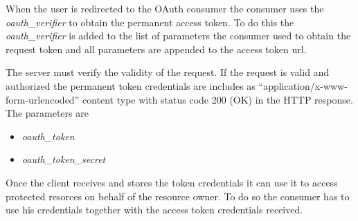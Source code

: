 When the user is redirected to the OAuth consumer the consumer uses
the \emph{oauth\_verifier} to obtain the permanent access token. To
do this the \emph{oauth\_verifier} is added to the list of
parameters the consumer used to obtain the request token and all
parameters are appended to the access token url.

The server must verify the validity of the request. If the request
is valid and authorized the permanent token credentials are
includes as ``application/x-www-form-urlencoded'' content type with
status code 200 (OK) in the HTTP response. The parameters are

\begin{itemize}
\item
  \emph{oauth\_token}
\item
  \emph{oauth\_token\_secret}
\end{itemize}
Once the client receives and stores the token credentials it can
use it to access protected resorces on behalf of the resource
owner. To do so the consumer has to use his credentials together
with the access token credentials received.
